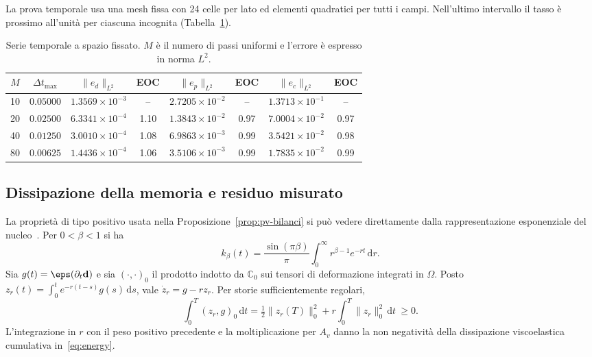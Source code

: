 La prova temporale usa una mesh fissa con 24 celle per lato ed elementi quadratici per tutti i campi. Nell'ultimo intervallo il tasso è prossimo all'unità per ciascuna incognita (Tabella~\ref{tab:app-mms-temporal}).

\begin{table}[H]
\centering
\caption{Serie temporale a spazio fissato. $M$ è il numero di passi uniformi e l'errore è espresso in norma $L^2$.}
\label{tab:app-mms-temporal}
\small
\setlength{\tabcolsep}{7pt}
\begin{tabular}{@{}cccccccc@{}}
\toprule
$M$ & $\Delta t_{\max}$ & $\|e_d\|_{L^2}$ & EOC & $\|e_p\|_{L^2}$ & EOC & $\|e_c\|_{L^2}$ & EOC \\
\midrule
10 & $0.05000$ & $1.3569\times10^{-3}$ & --   & $2.7205\times10^{-2}$ & --   & $1.3713\times10^{-1}$ & --   \\
20 & $0.02500$ & $6.3341\times10^{-4}$ & 1.10 & $1.3843\times10^{-2}$ & 0.97 & $7.0004\times10^{-2}$ & 0.97 \\
40 & $0.01250$ & $3.0010\times10^{-4}$ & 1.08 & $6.9863\times10^{-3}$ & 0.99 & $3.5421\times10^{-2}$ & 0.98 \\
80 & $0.00625$ & $1.4436\times10^{-4}$ & 1.06 & $3.5106\times10^{-3}$ & 0.99 & $1.7835\times10^{-2}$ & 0.99 \\
\bottomrule
\end{tabular}
\end{table}

\subsection{Dissipazione della memoria e residuo misurato}
La proprietà di tipo positivo usata nella Proposizione~\ref{prop:pv-bilanci} si può vedere direttamente dalla rappresentazione esponenziale del nucleo~\citep{caponi2021sapio,failla2020advanced}. Per $0<\beta<1$ si ha
\[
 k_\beta(t)=\frac{\sin(\pi\beta)}{\pi}\int_0^\infty r^{\beta-1}e^{-rt}\,\mathrm dr.
\]
Sia $g(t)=\eps(\partial_t\mathbf d)$ e sia $(\cdot,\cdot)_0$ il prodotto indotto da $\mathbb C_0$ sui tensori di deformazione integrati in $\Omega$. Posto $z_r(t)=\int_0^t e^{-r(t-s)}g(s)\,\mathrm ds$, vale $\dot z_r=g-rz_r$. Per storie sufficientemente regolari,
\[
 \int_0^T(z_r,g)_0\,\mathrm dt
 =\tfrac12\|z_r(T)\|_0^2+r\int_0^T\|z_r\|_0^2\,\mathrm dt\ \geq 0 .
\]
L'integrazione in $r$ con il peso positivo precedente e la moltiplicazione per $A_v$ danno la non negatività della dissipazione viscoelastica cumulativa in~\eqref{eq:energy}.

